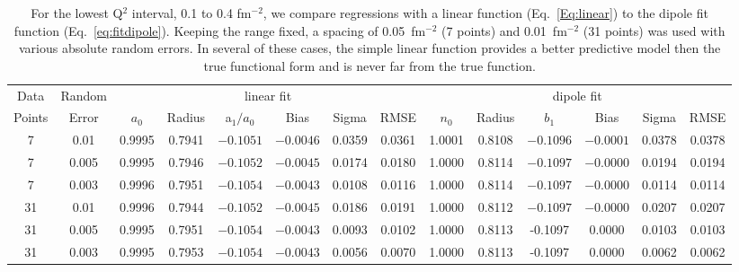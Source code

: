 \documentclass[10pt,aps,prc,twocolumn]{revtex4-1}
\begin{document}
\begin{table}
\caption{For the lowest Q$^2$ interval, 0.1 to 0.4 fm$^{-2}$, we compare regressions with
a linear function (Eq.~\ref{Eq:linear}) to the dipole fit function (Eq.~\ref{eq:fitdipole}).   Keeping the range
fixed, a spacing of 0.05~fm$^{-2}$ (7 points) and 0.01~fm$^{-2}$ (31 points) was used
with various absolute random errors.  In several of these cases, the simple linear 
function provides a better predictive model then the true functional form and is never 
far from the true function.}
\begin{tabular}{cc|cccccc|cccccc} \hline
Data   & Random   & \multicolumn{6}{c|}{linear fit}                       & \multicolumn{6}{c}{dipole fit}            \\ 
Points & Error    & $a_0$ & Radius&a$_1/a_0$&  Bias  & Sigma &  RMSE  & $n_0$ & Radius& $b_1$  &  Bias  & Sigma &  RMSE   \\  \hline
7      & 0.01     & 0.9995& 0.7941& $-0.1051$& $-0.0046$& 0.0359& 0.0361 & 1.0001& 0.8108& $-0.1096$& $-0.0001$& 0.0378& 0.0378  \\ 
7      & 0.005    & 0.9995& 0.7946& $-0.1052$& $-0.0045$& 0.0174& 0.0180 & 1.0000& 0.8114& $-0.1097$& $-0.0000$& 0.0194& 0.0194  \\
7      & 0.003    & 0.9996& 0.7951& $-0.1054$& $-0.0043$& 0.0108& 0.0116 & 1.0000& 0.8114& $-0.1097$& $-0.0000$& 0.0114& 0.0114  \\
31     & 0.01     & 0.9996& 0.7944& $-0.1052$& $-0.0045$& 0.0186& 0.0191 & 1.0000& 0.8112& $-0.1097$& $-0.0000$& 0.0207& 0.0207  \\
31     & 0.005    & 0.9995& 0.7951& $-0.1054$& $-0.0043$& 0.0093& 0.0102 & 1.0000& 0.8113& -0.1097&  0.0000& 0.0103& 0.0103  \\
31     & 0.003    & 0.9995& 0.7953& $-0.1054$& $-0.0043$& 0.0056& 0.0070 & 1.0000& 0.8113& -0.1097&  0.0000& 0.0062& 0.0062   \\ \hline 
\end{tabular}
\label{simpleVSperfect}
\end{table}
\end{document}
